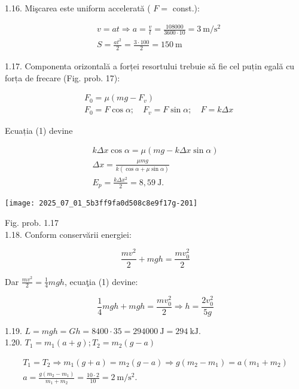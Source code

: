 1.16. Mişcarea este uniform accelerată ( $F=$ const.):

$$
\begin{aligned}
& v=a t \Rightarrow a=\frac{v}{t}=\frac{108000}{3600 \cdot 10}=3 \mathrm{~m} / \mathrm{s}^{2} \\
& S=\frac{a t^{2}}{2}=\frac{3 \cdot 100}{2}=150 \mathrm{~m}
\end{aligned}
$$

1.17. Componenta orizontală a forței resortului trebuie sǎ fie cel puțin egală cu forța de frecare (Fig. prob. 17):


\begin{align*}
& F_{0}=\mu\left(m g-F_{v}\right)  \tag{1}\\
& F_{0}=F \cos \alpha ; \quad F_{v}=F \sin \alpha ; \quad F=k \Delta x \tag{2}
\end{align*}


Ecuația (1) devine

$$
\begin{gathered}
k \Delta x \cos \alpha=\mu(m g-k \Delta x \sin \alpha) \\
\Delta x=\frac{\mu m g}{k(\cos \alpha+\mu \sin \alpha)} \\
E_{p}=\frac{k \Delta x^{2}}{2}=8,59 \mathrm{~J} .
\end{gathered}
$$

\begin{center}
\texttt{[image: 2025\_07\_01\_5b3ff9fa0d508c8e9f17g-201]}
\end{center}

Fig. prob. 1.17\\
1.18. Conform conservării energiei:


\begin{equation*}
\frac{m v^{2}}{2}+m g h=\frac{m v_{0}^{2}}{2} \tag{1}
\end{equation*}


Dar $\frac{m v^{2}}{2}=\frac{1}{4} m g h$, ecuaţia (1) devine:

$$
\frac{1}{4} m g h+m g h=\frac{m v_{0}^{2}}{2} \Rightarrow h=\frac{2 v_{0}^{2}}{5 g}
$$

1.19. $L=m g h=G h=8400 \cdot 35=294000 \mathrm{~J}=294 \mathrm{~kJ}$.\\
1.20. $T_{1}=m_{1}(a+g) ; T_{2}=m_{2}(g-a)$

$$
\begin{gathered}
T_{1}=T_{2} \Rightarrow m_{1}(g+a)=m_{2}(g-a) \Rightarrow g\left(m_{2}-m_{1}\right)=a\left(m_{1}+m_{2}\right) \\
a=\frac{g\left(m_{2}-m_{1}\right)}{m_{1}+m_{2}}=\frac{10 \cdot 2}{10}=2 \mathrm{~m} / \mathrm{s}^{2} .
\end{gathered}
$$

